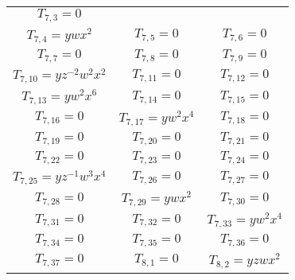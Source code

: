 \documentclass[12pt]{memoireuqam1.3}
\begin{document}
\begin{longtable}{|c|c|c|}
$T_{7,3}= 0$\\

$T_{7,4}= ywx^2$&

$T_{7,5}= 0$&

$T_{7,6}= 0$\\

$T_{7,7}= 0$&

$T_{7,8}= 0$&

$T_{7,9}= 0$\\

$T_{7,10}= yz^{-2}w^2x^2$&

$T_{7,11}= 0$&

$T_{7,12}= 0$\\

$T_{7,13}= yw^2x^6$&

$T_{7,14}= 0$&

$T_{7,15}= 0$\\

$T_{7,16}= 0$&

$T_{7,17}= yw^2x^4$&

$T_{7,18}= 0$\\

$T_{7,19}= 0$&

$T_{7,20}= 0$&

$T_{7,21}= 0$\\

$T_{7,22}= 0$&

$T_{7,23}= 0$&

$T_{7,24}= 0$\\

$T_{7,25}= yz^{-1}w^3x^4$&

$T_{7,26}= 0$&

$T_{7,27}= 0$\\

$T_{7,28}= 0$&

$T_{7,29}= ywx^2$&

$T_{7,30}= 0$\\

$T_{7,31}= 0$&

$T_{7,32}= 0$&

$T_{7,33}= yw^2x^4$\\

$T_{7,34}= 0$&

$T_{7,35}= 0$&

$T_{7,36}= 0$\\

$T_{7,37}= 0$&

$T_{8,1}= 0$&

$T_{8,2}= yzwx^2$\\


\end{longtable}
\end{document}
